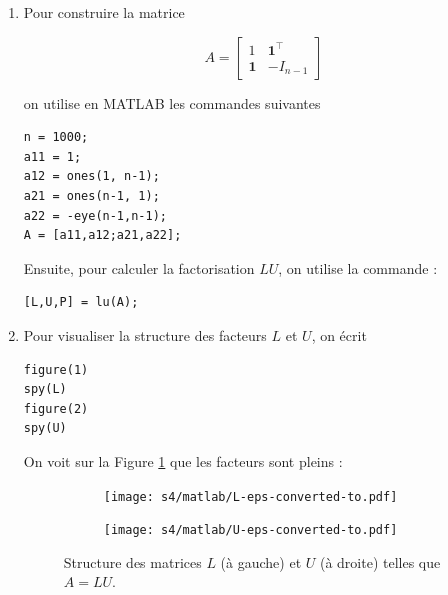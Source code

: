\begin{enumerate}[label=\alph*)]
  \item Pour construire la matrice
  
        \begin{equation*}
          A = \begin{bmatrix}
                1 & \textbf{1}^{\top}   \\
                \textbf{1} & -I_{n - 1}
              \end{bmatrix}
        \end{equation*}
        
        on utilise en \textsc{MATLAB} les commandes suivantes
        
\begin{verbatim}
n = 1000;
a11 = 1;
a12 = ones(1, n-1);
a21 = ones(n-1, 1);
a22 = -eye(n-1,n-1);
A = [a11,a12;a21,a22];
\end{verbatim}

      Ensuite, pour calculer la factorisation $LU$, on utilise la commande :
      
\begin{verbatim}
[L,U,P] = lu(A);
\end{verbatim}

  \item Pour visualiser la structure des facteurs $L$ et $U$, on écrit
  
\begin{verbatim}
figure(1)
spy(L)
figure(2)
spy(U)
\end{verbatim}  

    On voit sur la Figure \ref{fig:lu} que les facteurs sont pleins :

    \begin{figure}[h!]
      \begin{subfigure}[b]{0.5\linewidth}
        \centering
        \texttt{[image: s4/matlab/L-eps-converted-to.pdf]} 
      \end{subfigure}
      \begin{subfigure}[b]{0.5\linewidth}
        \centering
        \texttt{[image: s4/matlab/U-eps-converted-to.pdf]} 
      \end{subfigure} 
      \caption{Structure des matrices $L$ (à gauche) et $U$ (à droite) telles que $A = LU$.}
      \label{fig:lu}
    \end{figure}   
    

\end{enumerate}
